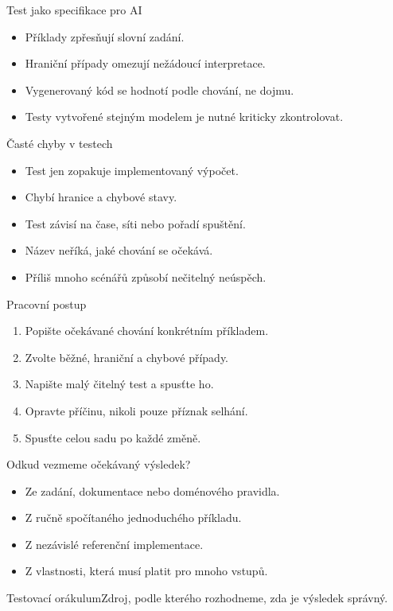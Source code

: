 \documentclass[aspectratio=169]{beamer}
\begin{document}
\begin{frame}{Test jako specifikace pro AI}
\begin{itemize}
\item Příklady zpřesňují slovní zadání.
\item Hraniční případy omezují nežádoucí interpretace.
\item Vygenerovaný kód se hodnotí podle chování, ne dojmu.
\item Testy vytvořené stejným modelem je nutné kriticky zkontrolovat.
\end{itemize}
\end{frame}

\begin{frame}{Časté chyby v testech}
\begin{itemize}
\item Test jen zopakuje implementovaný výpočet.
\item Chybí hranice a chybové stavy.
\item Test závisí na čase, síti nebo pořadí spuštění.
\item Název neříká, jaké chování se očekává.
\item Příliš mnoho scénářů způsobí nečitelný neúspěch.
\end{itemize}
\end{frame}

\begin{frame}{Pracovní postup}
\begin{enumerate}
\item Popište očekávané chování konkrétním příkladem.
\item Zvolte běžné, hraniční a chybové případy.
\item Napište malý čitelný test a spusťte ho.
\item Opravte příčinu, nikoli pouze příznak selhání.
\item Spusťte celou sadu po každé změně.
\end{enumerate}
\end{frame}

\begin{frame}{Odkud vezmeme očekávaný výsledek?}
\begin{itemize}
\item Ze zadání, dokumentace nebo doménového pravidla.
\item Z ručně spočítaného jednoduchého příkladu.
\item Z nezávislé referenční implementace.
\item Z vlastnosti, která musí platit pro mnoho vstupů.
\end{itemize}
\begin{block}{Testovací orákulum}Zdroj, podle kterého rozhodneme, zda je výsledek správný.\end{block}
\end{frame}
\end{document}
